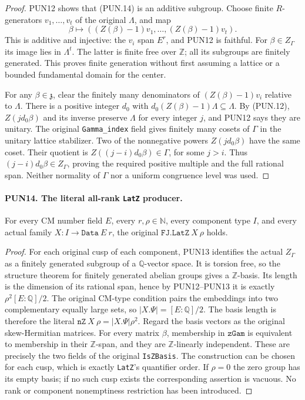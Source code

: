 \begin{proof}
PUN12 shows that (PUN.14) is an additive subgroup.  Choose finite
\(R\)-generators \(v_1,\ldots,v_t\) of the original
\(\Lambda\), and map
\[
 \beta\longmapsto
        ((Z(\beta)-1)v_1,\ldots,(Z(\beta)-1)v_t).
 \tag{PUN.15}
\]
This is additive and injective: the \(v_i\) span \(E^r\),
and PUN12 is faithful.  For \(\beta\in Z_\Gamma\) its
image lies in \(\Lambda^t\).  The latter is finite free over
\(\mathbb Z\); all its subgroups are finitely generated.
This proves finite generation without first assuming a lattice
or a bounded fundamental domain for the center.

For any \(\beta\in\mathfrak z\), clear the finitely many
denominators of \((Z(\beta)-1)v_i\) relative to \(\Lambda\).
There is a positive integer \(d_0\) with
\(d_0(Z(\beta)-1)\Lambda\subseteq\Lambda\).
By (PUN.12), \(Z(jd_0\beta)\) and its inverse preserve
\(\Lambda\) for every integer \(j\), and PUN12 says they
are unitary.  The original \texttt{Gamma\_index} field gives
finitely many cosets of \(\Gamma\) in the unitary lattice
stabilizer.  Two of the nonnegative powers
\(Z(jd_0\beta)\) have the same coset.  Their quotient is
\(Z((j-i)d_0\beta)\in\Gamma\), for some \(j>i\).
Thus \((j-i)d_0\beta\in Z_\Gamma\), proving the required
positive multiple and the full rational span.  Neither normality
of \(\Gamma\) nor a uniform congruence level was used.
\end{proof}

\paragraph{PUN14. The literal all-rank \texttt{LatZ} producer.}
\label{claim:PUN14}
For every CM number field \(E\), every \(r,\rho\in\mathbb N\),
every component type \(I\), and every actual family
\(X:I\to\texttt{Data}\ E\ r\), the original
\(\texttt{FJ.LatZ}\ X\ \rho\) holds.

\begin{proof}
For each original cusp of each component, PUN13 identifies the
actual \(Z_\Gamma\) as a finitely generated subgroup of a
\(\mathbb Q\)-vector space.  It is torsion free, so the
structure theorem for finitely generated abelian groups gives
a \(\mathbb Z\)-basis.  Its length is the dimension of its
rational span, hence by PUN12--PUN13 it is exactly
\(\rho^2[E:\mathbb Q]/2\).  The original CM-type condition
pairs the embeddings into two complementary equally large sets,
so \(|X.\Psi|=[E:\mathbb Q]/2\).  The basis length is therefore
the literal \(\texttt{nZ}\ X\ \rho=|X.\Psi|\rho^2\).
Regard the basis vectors as the
original skew-Hermitian matrices.  For every matrix \(\beta\),
membership in \(\texttt{zGam}\) is equivalent to membership
in their \(\mathbb Z\)-span, and they are \(\mathbb Z\)-linearly
independent.  These are precisely the two fields of the original
\texttt{IsZBasis}.  The construction can be chosen for each cusp,
which is exactly \texttt{LatZ}'s quantifier order.  If \(\rho=0\)
the zero group has its empty basis; if no such cusp exists the
corresponding assertion is vacuous.  No rank or component
nonemptiness restriction has been introduced.
\end{proof}

